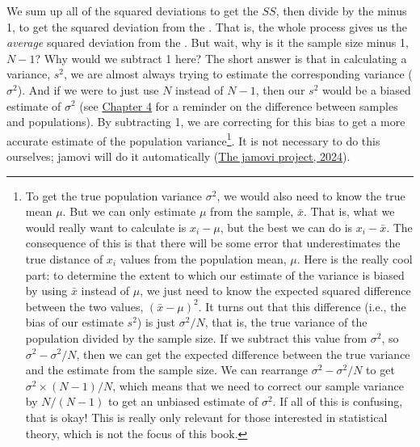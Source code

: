 \documentclass[
  openany]{krantz}
\begin{document}
We sum up all of the squared deviations to get the \(SS\), then divide by the  minus 1, to get the  squared deviation from the .
That is, the whole process gives us the \emph{average} squared deviation from the .
But wait, why is it the sample size minus 1, \(N - 1\)?
Why would we subtract 1 here?
The short answer is that in calculating a \emph{} variance, \(s^{2}\), we are almost always trying to estimate the corresponding \emph{} variance (\(\sigma^{2}\)).
And if we were to just use \(N\) instead of \(N - 1\), then our \(s^{2}\) would be a biased estimate of \(\sigma^{2}\) (see \protect\hyperlink{Chapter_4}{Chapter 4} for a reminder on the difference between samples and populations).
By subtracting 1, we are correcting for this bias to get a more accurate estimate of the population variance\footnote{To get the true population variance \(\sigma^{2}\), we would also need to know the true mean \(\mu\). But we can only estimate \(\mu\) from the sample, \(\bar{x}\). That is, what we would really want to calculate is \(x_{i} - \mu\), but the best we can do is \(x_{i} - \bar{x}\). The consequence of this is that there will be some error that underestimates the true distance of \(x_{i}\) values from the population mean, \(\mu\). Here is the really cool part: to determine the extent to which our estimate of the variance is biased by using \(\bar{x}\) instead of \(\mu\), we just need to know the expected squared difference between the two values, \((\bar{x} - \mu)^{2}\). It turns out that this difference (i.e., the bias of our estimate \(s^{2}\)) is just \(\sigma^{2} / N\), that is, the true variance of the population divided by the sample size. If we subtract this value from \(\sigma^{2}\), so \(\sigma^{2} - \sigma^{2}/N\), then we can get the expected difference between the true variance and the estimate from the sample size. We can rearrange \(\sigma^{2} - \sigma^{2}/N\) to get \(\sigma^{2} \times (N - 1)/N\), which means that we need to correct our sample variance by \(N / (N-1)\) to get an unbiased estimate of \(\sigma^{2}\). If all of this is confusing, that is okay! This is really only relevant for those interested in statistical theory, which is not the focus of this book.}.
It is not necessary to do this ourselves; jamovi will do it automatically (\protect\hyperlink{ref-Jamovi2022}{The jamovi project, 2024}).
\end{document}
